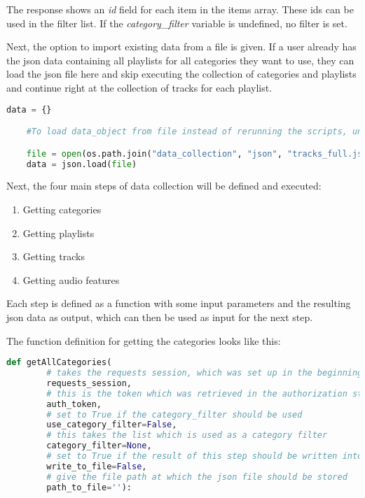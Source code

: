 The response shows an \emph{id} field for each item in the items array.
These ids can be used in the filter list.
If the \emph{category\_filter} variable is undefined, no filter is set.

Next, the option to import existing data from a file is given.
If a user already has the json data containing all playlists for all categories they want to use,
they can load the json file here and skip executing the collection of categories and playlists and continue right
at the collection of tracks for each playlist.

\begin{lstlisting}[language=Python]
    data = {}

    #To load data_object from file instead of rerunning the scripts, uncomment this:

    file = open(os.path.join("data_collection", "json", "tracks_full.json"))
    data = json.load(file)
\end{lstlisting} 

Next, the four main steps of data collection will be defined and executed:

\begin{enumerate}
    \item Getting categories
    \item Getting playlists
    \item Getting tracks
    \item Getting audio features
\end{enumerate}

Each step is defined as a function with some input parameters and the resulting json data as output, which can then
be used as input for the next step.

The function definition for getting the categories looks like this:

\begin{lstlisting}[language=Python]
    def getAllCategories(
        # takes the requests session, which was set up in the beginning
        requests_session,
        # this is the token which was retrieved in the authorization step
        auth_token,
        # set to True if the category_filter should be used
        use_category_filter=False, 
        # this takes the list which is used as a category filter
        category_filter=None,  
        # set to True if the result of this step should be written into a json file
        write_to_file=False, 
        # give the file path at which the json file should be stored
        path_to_file=''): 
\end{lstlisting}


